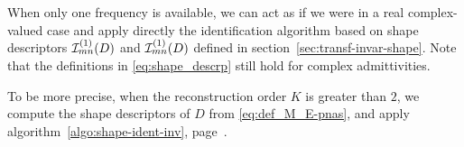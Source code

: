 When only one frequency is available, we can act as if we were in a real 
complex-valued case and apply directly the identification algorithm based on
shape descriptors $\mathcal{I}^{(1)}_{mn}(D)$ and $\mathcal{I}^{(1)}_{mn}(D)$ defined in section~\ref{sec:transf-invar-shape}.
Note that the definitions in \eqref{eq:shape_descrp} still hold for complex
admittivities.

To be more precise, when the reconstruction order $K$ is greater than $2$, we
compute the shape descriptors of $D$ from \eqref{eq:def_M_E-pnas},
and apply algorithm~\ref{algo:shape-ident-inv}, page~\pageref{algo:shape-ident-inv}.

% 
% 
